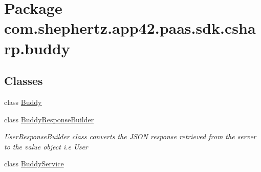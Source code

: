 \hypertarget{namespacecom_1_1shephertz_1_1app42_1_1paas_1_1sdk_1_1csharp_1_1buddy}{\section{Package com.\+shephertz.\+app42.\+paas.\+sdk.\+csharp.\+buddy}
\label{namespacecom_1_1shephertz_1_1app42_1_1paas_1_1sdk_1_1csharp_1_1buddy}
}
\subsection*{Classes}
\begin{DoxyCompactItemize}
\item 
class \hyperlink{classcom_1_1shephertz_1_1app42_1_1paas_1_1sdk_1_1csharp_1_1buddy_1_1_buddy}{Buddy}
\item 
class \hyperlink{classcom_1_1shephertz_1_1app42_1_1paas_1_1sdk_1_1csharp_1_1buddy_1_1_buddy_response_builder}{Buddy\+Response\+Builder}
\begin{DoxyCompactList}\small\item\em User\+Response\+Builder class converts the J\+S\+O\+N response retrieved from the server to the value object i.\+e User \end{DoxyCompactList}\item 
class \hyperlink{classcom_1_1shephertz_1_1app42_1_1paas_1_1sdk_1_1csharp_1_1buddy_1_1_buddy_service}{Buddy\+Service}
\end{DoxyCompactItemize}
